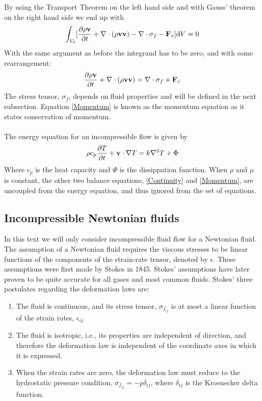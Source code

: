 By using the Transport Theorem on the left hand side and with Gauss' theorem on the right hand side we end up with
\begin{align*} \int_{V_0} [ \frac{\partial \rho \mathbf{v}}{\partial t} + \nabla \cdot (\rho \mathbf{v}\mathbf{v} ) - \nabla \cdot \sigma_f - \mathbf{F}_v] \mathrm{d}V = 0
\end{align*}
With the same argument as before the integrand has to be zero, and with some rearrangement:
\begin{align}
\frac{\partial \rho \mathbf{v}}{\partial t} + \nabla \cdot (\rho \mathbf{v}\mathbf{v} ) = \nabla \cdot \sigma_f + \mathbf{F}_v \label{Momentum}
\end{align} 
The stress tensor, $\sigma_f$, depends on fluid properties and will be defined in the next subsection. Equation \eqref{Momentum} is known as the momentum equation as it states conservation of momentum.
\\
\\
The energy equation for an incompressible flow is given by
\begin{align}
\rho c_p \frac{\partial T}{\partial t} + \mathbf{v}\cdot \nabla T = k \nabla^2 T + \Phi \label{Energy}
\end{align}
Where $c_p$ is the heat capacity and $\Phi$ is the dissippation function. When $\rho$ and $\mu$ is constant, the other two balance equations, \eqref{Continuity} and \eqref{Momentum}, are uncoupled from the energy equation, and thus ignored from the set of equations. 
\subsection{Incompressible Newtonian fluids}
In this text we will only consider incompressible fluid flow for a Newtonian fluid. 
The assumption of a Newtonian fluid requires the viscous stresses to be linear functions of the components of the strain-rate tensor, denoted by $\epsilon$. These assumptions were first made by Stokes in 1845. Stokes' assumptions have later proven to be quite accurate for all gases and most common fluids. Stokes' three postulates regarding the deformation laws are: \cite{Whit06}
\begin{enumerate}
\item The fluid is continuous, and its stress tensor, $\sigma_{f_{ij}}$ is at most a linear function of the strain rates, $\epsilon_{ij}$ 
\item The fluid is isotropic, i.e., its properties are independent of direction, and therefore the deformation law is independent of the coordinate axes in which it is expressed. 
\item When the strain rates are zero, the deformation law must reduce to the hydrostatic pressure condition, $\sigma_{f_{ij}} = -p\delta_{ij}$, where $\delta_{ij}$ is the Kroenecker delta function. 
\end{enumerate}


